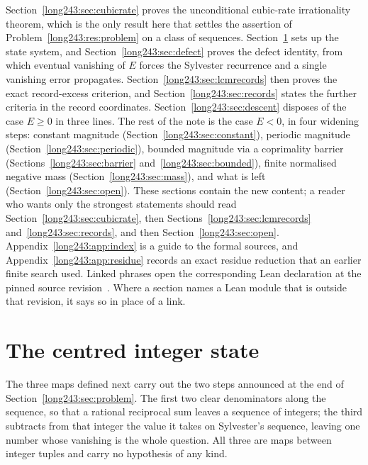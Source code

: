 Section~\ref{long243:sec:cubicrate} proves the unconditional cubic-rate irrationality
theorem, which is the only result here that settles the assertion of
Problem~\ref{long243:res:problem} on a class of sequences.
Section~\ref{long243:sec:state} sets up the state system, and Section~\ref{long243:sec:defect}
proves the defect identity, from which eventual vanishing of $E$ forces the
Sylvester recurrence and a single vanishing error propagates.
Section~\ref{long243:sec:lcmrecords} then proves the exact record-excess criterion, and
Section~\ref{long243:sec:records} states the further criteria in the record
coordinates.  Section~\ref{long243:sec:descent} disposes of the case $E\ge0$ in three
lines.  The rest of the note is the case $E<0$, in four widening steps:
constant magnitude (Section~\ref{long243:sec:constant}), periodic magnitude
(Section~\ref{long243:sec:periodic}), bounded magnitude via a coprimality barrier
(Sections~\ref{long243:sec:barrier} and~\ref{long243:sec:bounded}), finite normalised negative
mass (Section~\ref{long243:sec:mass}), and what is left (Section~\ref{long243:sec:open}).
These sections contain the new content; a reader who wants only the strongest
statements should read Section~\ref{long243:sec:cubicrate}, then
Sections~\ref{long243:sec:lcmrecords} and~\ref{long243:sec:records}, and
then Section~\ref{long243:sec:open}.  Appendix~\ref{long243:app:index} is a guide to the formal
sources, and Appendix~\ref{long243:app:residue} records an exact residue reduction that
an earlier finite search used.  Linked phrases open the corresponding Lean
declaration at the pinned source revision~\commitshort.  Where a section names
a Lean module that is outside that revision, it says so in place of a link.

\section{The centred integer state}\label{long243:sec:state}

The three maps defined next carry out the two steps announced at the end of
Section~\ref{long243:sec:problem}.  The first two clear denominators along the
sequence, so that a rational reciprocal sum leaves a sequence of integers; the
third subtracts from that integer the value it takes on Sylvester's sequence,
leaving one number whose vanishing is the whole question.  All three are maps
between integer tuples and carry no hypothesis of any kind.

